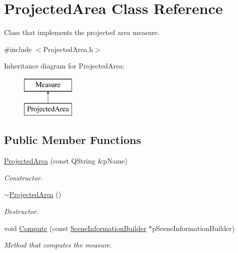 \hypertarget{class_projected_area}{\section{Projected\+Area Class Reference}
\label{class_projected_area}
}


Class that implements the projected area measure.  




{\ttfamily \#include $<$Projected\+Area.\+h$>$}

Inheritance diagram for Projected\+Area\+:\begin{figure}[H]
\begin{center}
\leavevmode
\includegraphics[height=2.000000cm]{class_projected_area}
\end{center}
\end{figure}
\subsection*{Public Member Functions}
\begin{DoxyCompactItemize}
\item 
\hyperlink{class_projected_area_aa033c0455632352ccf150482773f37cd}{Projected\+Area} (const Q\+String \&p\+Name)
\begin{DoxyCompactList}\small\item\em Constructor. \end{DoxyCompactList}\item 
\hyperlink{class_projected_area_a63ec33cc3105dd939a24346fd0aeafb5}{$\sim$\+Projected\+Area} ()
\begin{DoxyCompactList}\small\item\em Destructor. \end{DoxyCompactList}\item 
void \hyperlink{class_projected_area_ae035110fffb317c4c90785b96e23388c}{Compute} (const \hyperlink{class_scene_information_builder}{Scene\+Information\+Builder} $\ast$p\+Scene\+Information\+Builder)
\begin{DoxyCompactList}\small\item\em Method that computes the measure. \end{DoxyCompactList}\end{DoxyCompactItemize}
